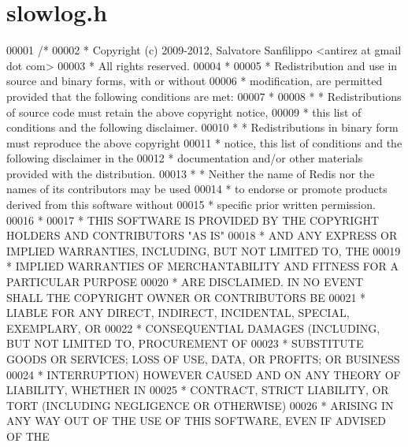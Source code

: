 \hypertarget{slowlog_8h_source}{}\section{slowlog.\+h}
\label{slowlog_8h_source}

\begin{DoxyCode}
00001 \textcolor{comment}{/*}
00002 \textcolor{comment}{ * Copyright (c) 2009-2012, Salvatore Sanfilippo <antirez at gmail dot com>}
00003 \textcolor{comment}{ * All rights reserved.}
00004 \textcolor{comment}{ *}
00005 \textcolor{comment}{ * Redistribution and use in source and binary forms, with or without}
00006 \textcolor{comment}{ * modification, are permitted provided that the following conditions are met:}
00007 \textcolor{comment}{ *}
00008 \textcolor{comment}{ *   * Redistributions of source code must retain the above copyright notice,}
00009 \textcolor{comment}{ *     this list of conditions and the following disclaimer.}
00010 \textcolor{comment}{ *   * Redistributions in binary form must reproduce the above copyright}
00011 \textcolor{comment}{ *     notice, this list of conditions and the following disclaimer in the}
00012 \textcolor{comment}{ *     documentation and/or other materials provided with the distribution.}
00013 \textcolor{comment}{ *   * Neither the name of Redis nor the names of its contributors may be used}
00014 \textcolor{comment}{ *     to endorse or promote products derived from this software without}
00015 \textcolor{comment}{ *     specific prior written permission.}
00016 \textcolor{comment}{ *}
00017 \textcolor{comment}{ * THIS SOFTWARE IS PROVIDED BY THE COPYRIGHT HOLDERS AND CONTRIBUTORS "AS IS"}
00018 \textcolor{comment}{ * AND ANY EXPRESS OR IMPLIED WARRANTIES, INCLUDING, BUT NOT LIMITED TO, THE}
00019 \textcolor{comment}{ * IMPLIED WARRANTIES OF MERCHANTABILITY AND FITNESS FOR A PARTICULAR PURPOSE}
00020 \textcolor{comment}{ * ARE DISCLAIMED. IN NO EVENT SHALL THE COPYRIGHT OWNER OR CONTRIBUTORS BE}
00021 \textcolor{comment}{ * LIABLE FOR ANY DIRECT, INDIRECT, INCIDENTAL, SPECIAL, EXEMPLARY, OR}
00022 \textcolor{comment}{ * CONSEQUENTIAL DAMAGES (INCLUDING, BUT NOT LIMITED TO, PROCUREMENT OF}
00023 \textcolor{comment}{ * SUBSTITUTE GOODS OR SERVICES; LOSS OF USE, DATA, OR PROFITS; OR BUSINESS}
00024 \textcolor{comment}{ * INTERRUPTION) HOWEVER CAUSED AND ON ANY THEORY OF LIABILITY, WHETHER IN}
00025 \textcolor{comment}{ * CONTRACT, STRICT LIABILITY, OR TORT (INCLUDING NEGLIGENCE OR OTHERWISE)}
00026 \textcolor{comment}{ * ARISING IN ANY WAY OUT OF THE USE OF THIS SOFTWARE, EVEN IF ADVISED OF THE}

\end{DoxyCode}
